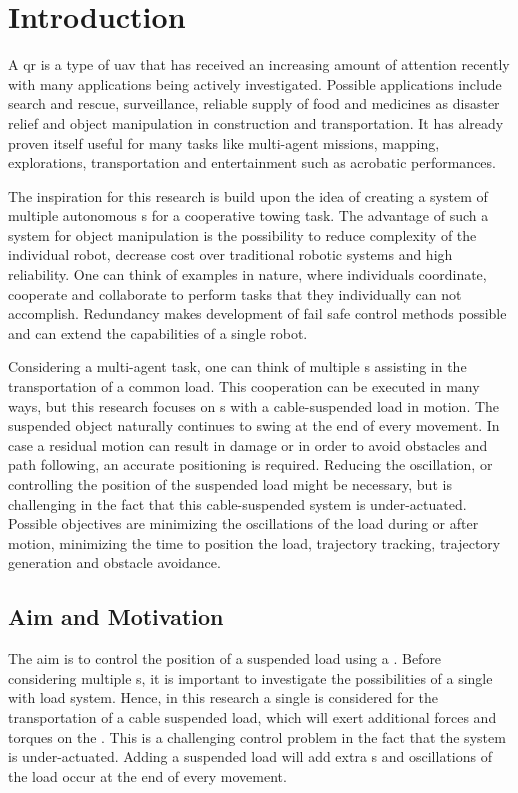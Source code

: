 \chapter{Introduction} \label{ch:intro}
A \acf{qr} is a type of \acf{uav} that has received an increasing amount of attention recently with many applications being actively investigated. Possible applications include search and rescue, surveillance, reliable supply of food and medicines as disaster relief and object manipulation in construction and transportation. It has already proven itself useful for many tasks like multi-agent missions, mapping, explorations, transportation and entertainment such as acrobatic performances.

The inspiration for this research is build upon the idea of creating a system of multiple autonomous s for a cooperative towing task. The advantage of such a system for object manipulation is the possibility to reduce complexity of the individual robot, decrease cost over traditional robotic systems and high reliability. One can think of examples in nature, where individuals coordinate, cooperate and collaborate to perform tasks that they individually can not accomplish. Redundancy makes development of fail safe control methods possible and can extend the capabilities of a single robot. 						

Considering a multi-agent task, one can think of multiple s assisting in the transportation of a common load. This cooperation can be executed in many ways, but this research focuses on s with a cable-suspended load in motion. The suspended object naturally continues to swing at the end of every movement. In case a residual motion can result in damage or in order to avoid obstacles and path following, an accurate positioning is required. Reducing the oscillation, or controlling the position of the suspended load might be necessary, but is challenging in the fact that this cable-suspended system is under-actuated. Possible objectives are minimizing the oscillations of the load during or after motion, minimizing the time to position the load, trajectory tracking, trajectory generation and obstacle avoidance.

\newpage
\section{Aim and Motivation}\label{sec:int.motivation}
The aim is to control the position of a suspended load using a . Before considering multiple s, it is important to investigate the possibilities of a single  with load system. Hence, in this research a single  is considered for the transportation of a cable suspended load, which will exert additional forces and torques on the . This is a challenging control problem in the fact that the  system is under-actuated. Adding a suspended load will add extra s and oscillations of the load occur at the end of every movement. 

